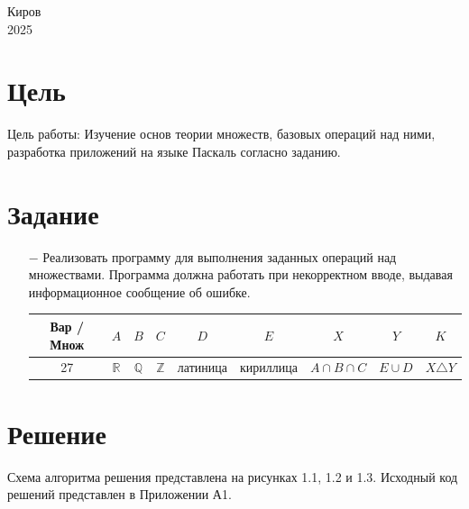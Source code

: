 \documentclass[oneside,a4paper,14pt]{extarticle}
\begin{document}
\begin{center}
	Киров\\
	2025
\end{center}

\newpage\thispagestyle{plain}

\section*{Цель}

Цель работы: Изучение основ теории множеств, базовых операций над ними, разработка приложений на языке Паскаль согласно заданию.

\section*{Задание}
\begin{itemize}
	\item[$-$] Реализовать программу для выполнения заданных операций над множествами. Программа должна работать при некорректном вводе, выдавая информационное сообщение об ошибке.
	
	\begin{tabular}{|c|c|c|c|c|c|c|c|c|}
		\hline
		Вар / Множ & $A$  & $B$  & $C$  & $D$      & $E$       & $X$               & $Y$      & $K$             \\
		\hline
		27         & $\mathbb{R}$ & $\mathbb{Q}$ & $\mathbb{Z}$ & латиница & кириллица & $A \cap B \cap C$ & $E \cup D$ & $X \triangle Y$ \\
		\hline
		\end{tabular}
\end{itemize}

\section*{Решение}

Схема алгоритма решения представлена на рисунках 1.1, 1.2 и 1.3. Исходный код решений представлен в Приложении А1.
\end{document}
